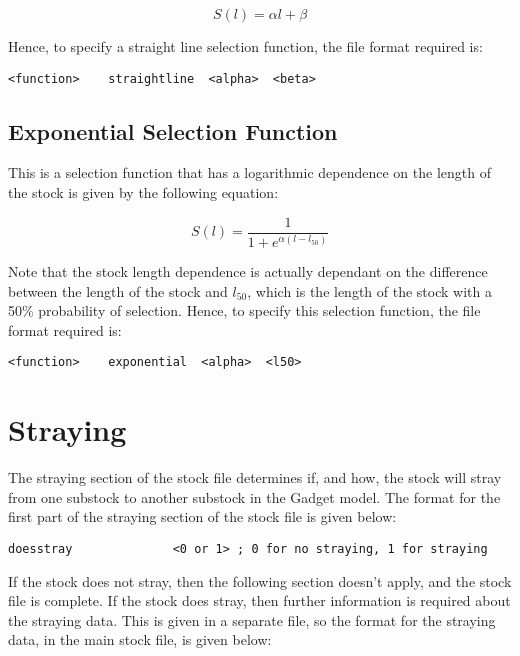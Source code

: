 \documentclass [a4paper, 10pt]{book}
\begin{document}
\begin{equation}\label{eq:straightsel}
S(l) = \alpha l + \beta
\end{equation}

\bigskip
Hence, to specify a straight line selection function, the file format required is:

{\small\begin{verbatim}
<function>    straightline  <alpha>  <beta>
\end{verbatim}}

\subsection{Exponential Selection Function}
This is a selection function that has a logarithmic dependence on the length of the stock is given by the following equation:

\begin{equation}\label{eq:expsel}
S(l) = { \frac{1}{1 + e^{ \alpha (l - l_{50})}}}
\end{equation}

\bigskip
Note that the stock length dependence is actually dependant on the difference between the length of the stock and $l_{50}$, which is the length of the stock with a 50\% probability of selection.  Hence, to specify this selection function, the file format required is:

{\small\begin{verbatim}
<function>    exponential  <alpha>  <l50>
\end{verbatim}}

\section{Straying}\label{sec:stockstray}
The straying section of the stock file determines if, and how, the stock will stray from one substock to another substock in the Gadget model.  The format for the first part of the straying section of the stock file is given below:

{\small\begin{verbatim}
doesstray              <0 or 1> ; 0 for no straying, 1 for straying
\end{verbatim}}

If the stock does not stray, then the following section doesn't apply, and the stock file is complete.  If the stock does stray, then further information is required about the straying data.  This is given in a separate file, so the format for the straying data, in the main stock file, is given below:
\end{document}
